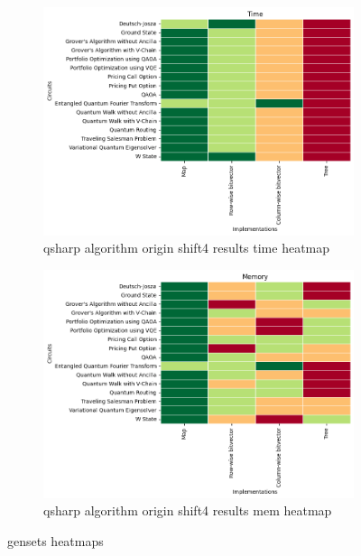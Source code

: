 
    \begin{figure}
    \centering
    \begin{subfigure}{.5\textwidth}
      \centering
      \includegraphics[width=1\linewidth]{benchmarks/./qsharp/gensets/algorithm/qsharp_algorithm_origin_shift4_results_time_heatmap.png}
      \caption{qsharp algorithm origin shift4 results time heatmap}
      \label{fig:gensets_qsharp_algorithm_origin_shift4_results_time_heatmap}
    \end{subfigure}
    \begin{subfigure}{.5\textwidth}
      \centering
      \includegraphics[width=1\linewidth]{benchmarks/./qsharp/gensets/algorithm/qsharp_algorithm_origin_shift4_results_mem_heatmap.png}
      \caption{qsharp algorithm origin shift4 results mem heatmap}
      \label{fig:gensets_qsharp_algorithm_origin_shift4_results_mem_heatmap}
    \end{subfigure}
    \caption{gensets heatmaps}
    \label{fig:gensets_qsharp_algorithm_origin_shift4_results_heatmaps}
    \end{figure}
    